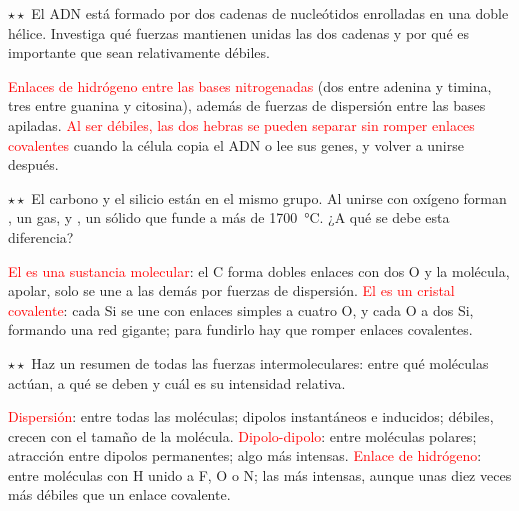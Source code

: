 \begin{exercise}
    \(\star\star\) El ADN está formado por dos cadenas de nucleótidos enrolladas en una doble hélice. Investiga qué fuerzas
    mantienen unidas las dos cadenas y por qué es importante que sean relativamente débiles.
    \begin{solu}
        \textcolor{red}{Enlaces de hidrógeno entre las bases nitrogenadas} (dos entre adenina y timina, tres entre guanina y
        citosina), además de fuerzas de dispersión entre las bases apiladas. \textcolor{red}{Al ser débiles, las dos hebras se
        pueden separar sin romper enlaces covalentes} cuando la célula copia el ADN o lee sus genes, y volver a unirse después.
    \end{solu}
\end{exercise}

\begin{exercise}
    \(\star\star\) El carbono y el silicio están en el mismo grupo. Al unirse con oxígeno forman , un gas, y ,
    un sólido que funde a más de \qty{1700}{\degreeCelsius}. ¿A qué se debe esta diferencia?
    \begin{solu}
        \textcolor{red}{El  es una sustancia molecular}: el C forma dobles enlaces con dos O y la molécula, apolar, solo se
        une a las demás por fuerzas de dispersión. \textcolor{red}{El  es un cristal covalente}: cada Si se une con
        enlaces simples a cuatro O, y cada O a dos Si, formando una red gigante; para fundirlo hay que romper enlaces covalentes.
    \end{solu}
\end{exercise}

\begin{exercise}
    \(\star\star\) Haz un resumen de todas las fuerzas intermoleculares: entre qué moléculas actúan, a qué se deben y cuál es su
    intensidad relativa.
    \begin{solu}
        \textcolor{red}{Dispersión}: entre todas las moléculas; dipolos instantáneos e inducidos; débiles, crecen con el tamaño de
        la molécula. \textcolor{red}{Dipolo-dipolo}: entre moléculas polares; atracción entre dipolos permanentes; algo más
        intensas. \textcolor{red}{Enlace de hidrógeno}: entre moléculas con H unido a F, O o N; las más intensas, aunque unas diez
        veces más débiles que un enlace covalente.
    \end{solu}
\end{exercise}

